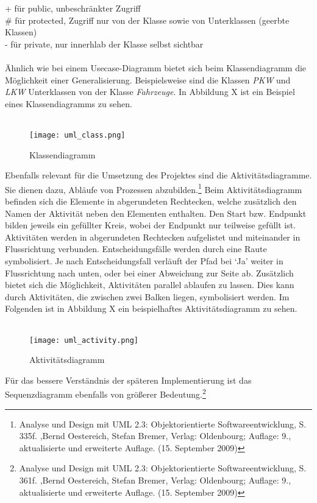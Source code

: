      + für public, unbeschränkter Zugriff\\
     \# für protected, Zugriff nur von der Klasse sowie von Unterklassen (geerbte Klassen)\\
     - für private, nur innerhlab der Klasse selbst sichtbar\\
\\
Ähnlich wie bei einem Usecase-Diagramm bietet sich beim Klassendiagramm die Möglichkeit einer Generalisierung.
Beispielsweise sind die Klassen \textit{PKW} und \textit{LKW} Unterklassen von der Klasse \textit{Fahrzeuge}. In Abbildung X ist ein Beispiel eines Klassendiagramms zu sehen.\\
\\
\begin{figure}[H]
\centering
\texttt{[image: uml\_class.png]}
\caption{Klassendiagramm}
\label{fig:show_s1_s2_p1_n1}
\end{figure}
Ebenfalls relevant für die Umsetzung des Projektes sind die Aktivitätsdiagramme.
Sie dienen dazu, Abläufe von Prozessen abzubilden.\footnote{Analyse und Design mit UML 2.3: Objektorientierte Softwareentwicklung, S. 335f. ,Bernd Oestereich, Stefan Bremer, Verlag: Oldenbourg; Auflage: 9., aktualisierte und erweiterte Auflage. (15. September 2009)}
Beim Aktivitätsdiagramm befinden sich die Elemente in abgerundeten Rechtecken, welche zusätzlich den Namen der Aktivität neben den Elementen enthalten.
Den Start bzw. Endpunkt bilden jeweils ein gefüllter Kreis, wobei der Endpunkt nur teilweise gefüllt ist. Aktivitäten werden in abgerundeten Rechtecken aufgelistet und miteinander in Flussrichtung verbunden. Entscheidungsfälle werden durch eine Raute symbolisiert.
Je nach Entscheidungsfall verläuft der Pfad bei ‘Ja’ weiter in Flussrichtung nach unten, oder bei einer Abweichung zur Seite ab.
Zusätzlich bietet sich die Möglichkeit, Aktivitäten parallel ablaufen zu lassen.
Dies kann durch Aktivitäten, die zwischen zwei Balken liegen, symbolisiert werden.
Im Folgenden ist in Abbildung X ein beispielhaftes Aktivitätsdiagramm zu sehen.\\
\\
\begin{figure}[H]
\centering
\texttt{[image: uml\_activity.png]}
\caption{Aktivitätsdiagramm}
\label{fig:show_s1_s2_p1_n1}
\end{figure}
Für das bessere Verständnis der späteren Implementierung ist das Sequenzdiagramm ebenfalls von größerer Bedeutung.\footnote{Analyse und Design mit UML 2.3: Objektorientierte Softwareentwicklung, S. 361f. ,Bernd Oestereich, Stefan Bremer, Verlag: Oldenbourg; Auflage: 9., aktualisierte und erweiterte Auflage. (15. September 2009)} 
